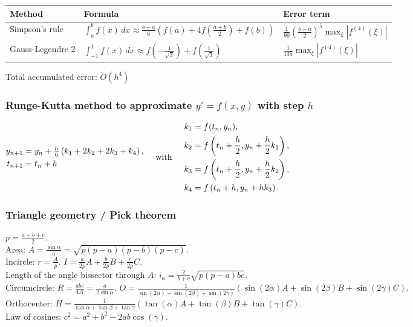 \documentclass[landscape,a4paper,twocolumn,10pt]{report}
\begin{document}
\begin{tabular}{@{}ll|l@{}}
Method & Formula & Error term \\
\hline
Simpson's rule &
$\int_a^b f(x) \, dx \approx \frac{b-a}{6} (f(a) + 4 f(\frac{a+b}{2}) + f(b))$ &
$\frac{1}{90}\left(\frac{b-a}{2}\right)^5 \max_\xi |f^{(4)}(\xi)|$
\\

Gauss-Legendre 2 &
$\int_{-1}^1 f(x) \, dx \approx f(-\frac{1}{\sqrt{3}}) + f(\frac{1}{\sqrt{3}})$ &
$\frac{1}{135} \max_\xi |f^{(4)}(\xi)|$
\end{tabular}

\noindent Total accumulated error: $O(h^4)$

\subsubsection*{Runge-Kutta method to approximate $y'=f(x,y)$ with step $h$}
$\begin{aligned}
y_{n+1} &= y_n + \tfrac{h}{6}\left(k_1 + 2k_2 + 2k_3 + k_4 \right),\\
t_{n+1} &= t_n + h \\
\end{aligned}
\hspace{0.5cm} \mbox{with} \hspace{0.5cm}
\begin{aligned}
 k_1 &= f(t_n, y_n), \\
 k_2 &= f\left(t_n + \frac{h}{2}, y_n + \frac{h}{2}k_1\right), \\
 k_3 &= f\left(t_n + \frac{h}{2}, y_n + \frac{h}{2}k_2\right), \\
 k_4 &= f\left(t_n + h, y_n + h k_3\right).
\end{aligned}
$


\subsubsection*{Triangle geometry / Pick theorem}

$p=\frac{a+b+c}{2}$.\\
Area: $A=\frac{\sin\alpha}{a}=\sqrt{p(p-a)(p-b)(p-c)}$.\\
Incircle: $r=\frac{A}{p}$. $I=\frac{a}{2p}A+\frac{b}{2p}B+\frac{c}{2p}C$.\\
Length of the angle bissector through $A$: $i_a=\frac{2}{b+c}\sqrt{p(p-a)bc}$.\\
Circumcircle: $R=\frac{abc}{4A}=\frac{a}{2\sin\alpha}$. $O=\frac{1}{\sin(2\alpha)+\sin(2\beta)+\sin(2\gamma)}(\sin(2\alpha)A+\sin(2\beta)B+\sin(2\gamma)C)$.\\
Orthocenter: $H=\frac{1}{\tan\alpha+\tan\beta+\tan\gamma}(\tan(\alpha)A+\tan(\beta)B+\tan(\gamma)C)$.\\
Law of cosines: $c^2=a^2+b^2-2ab\cos(\gamma)$.
\end{document}
